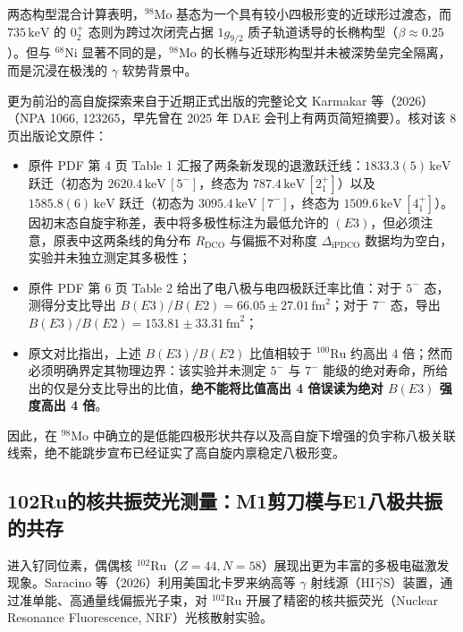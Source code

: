 两态构型混合计算表明，$^{98}\mathrm{Mo}$ 基态为一个具有较小四极形变的近球形过渡态，而 $735\,\mathrm{keV}$ 的 $0^+_2$ 态则为跨过次闭壳占据 $1g_{9/2}$ 质子轨道诱导的长椭构型（$\beta \approx 0.25$）。但与 $^{68}\mathrm{Ni}$ 显著不同的是，$^{98}\mathrm{Mo}$ 的长椭与近球形构型并未被深势垒完全隔离，而是沉浸在极浅的 $\gamma$ 软势背景中。

更为前沿的高自旋探索来自于近期正式出版的完整论文 Karmakar 等（2026）\cite{karmakar-2026-98mo-octupole}（NPA 1066, 123265，早先曾在 2025 年 DAE 会刊上有两页简短摘要）。核对该 8 页出版论文原件：
\begin{itemize}
\item 原件 PDF 第 4 页 Table 1 汇报了两条新发现的退激跃迁线：$1833.3(5)\,\mathrm{keV}$ 跃迁（初态为 $2620.4\,\mathrm{keV}\,[5^-]$，终态为 $787.4\,\mathrm{keV}\,[2^+_1]$）以及 $1585.8(6)\,\mathrm{keV}$ 跃迁（初态为 $3095.4\,\mathrm{keV}\,[7^-]$，终态为 $1509.6\,\mathrm{keV}\,[4^+_1]$）。因初末态自旋宇称差，表中将多极性标注为最低允许的 $(E3)$，但必须注意，原表中这两条线的角分布 $R_{\mathrm{DCO}}$ 与偏振不对称度 $\Delta_{\mathrm{iPDCO}}$ 数据均为空白，实验并未独立测定其多极性；
\item 原件 PDF 第 6 页 Table 2 给出了电八极与电四极跃迁率比值：对于 $5^-$ 态，测得分支比导出 $B(E3)/B(E2) = 66.05 \pm 27.01\,\mathrm{fm}^2$；对于 $7^-$ 态，导出 $B(E3)/B(E2) = 153.81 \pm 33.31\,\mathrm{fm}^2$；
\item 原文对比指出，上述 $B(E3)/B(E2)$ 比值相较于 $^{100}\mathrm{Ru}$ 约高出 4 倍；然而必须明确界定其物理边界：该实验并未测定 $5^-$ 与 $7^-$ 能级的绝对寿命，所给出的仅是分支比导出的比值，\textbf{绝不能将比值高出 4 倍误读为绝对 $B(E3)$ 强度高出 4 倍}。
\end{itemize}
因此，在 $^{98}\mathrm{Mo}$ 中确立的是低能四极形状共存以及高自旋下增强的负宇称八极关联线索，绝不能跳步宣布已经证实了高自旋内禀稳定八极形变。

\subsection{102Ru的核共振荧光测量：M1剪刀模与E1八极共振的共存}\label{sec:4-3-4}

进入钌同位素，偶偶核 $^{102}\mathrm{Ru}$（$Z=44, N=58$）展现出更为丰富的多极电磁激发现象。Saracino 等（2026）\cite{saracino-2026-102ru-scissors-octupole-resonances}利用美国北卡罗来纳高等 $\gamma$ 射线源（$\mathrm{HI}\vec{\gamma}\mathrm{S}$）装置，通过准单能、高通量线偏振光子束，对 $^{102}\mathrm{Ru}$ 开展了精密的核共振荧光（Nuclear Resonance Fluorescence, NRF）光核散射实验。

